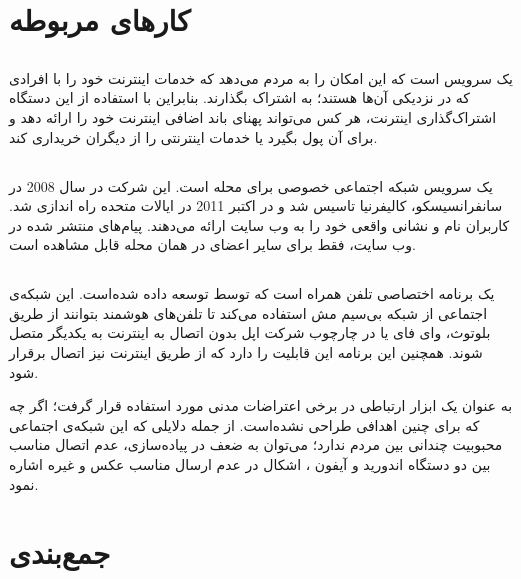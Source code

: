 \section{کار‌های مربوطه}
\subsection{}
 \href{https://www.opengarden.com}{}%
یک سرویس است که این امکان را به مردم می‌دهد که  خدمات اینترنت خود را با افرادی که در نزدیکی آن‌ها هستند؛ به اشتراک بگذارند. بنابراین با استفاده از این دستگاه اشتراک‌گذاری اینترنت، هر کس می‌تواند پهنای باند اضافی اینترنت خود را ارائه دهد و برای آن پول بگیرد یا خدمات اینترنتی را از دیگران خریداری کند.

\subsection{} 
 \href{https://nextdoor.com}{}%
یک سرویس شبکه اجتماعی خصوصی برای محله است. این شرکت در سال 2008 در سانفرانسیسکو، کالیفرنیا تاسیس شد و در اکتبر 2011 در ایالات متحده راه اندازی شد. کاربران 
نام و نشانی واقعی خود را به وب سایت ارائه می‌دهند. پیام‌های منتشر شده در وب سایت، فقط برای سایر اعضای  
در همان محله قابل مشاهده است.
\subsection{}
 \href{https://www.opengarden.com/firechat/}{}%
یک برنامه اختصاصی تلفن همراه است که توسط
توسعه داده شده‌است. این شبکه‌ی اجتماعی از شبکه بی‌سیم مش استفاده می‌کند تا تلفن‌های هوشمند بتوانند از طریق بلوتوث، وای فای یا در چارچوب
شرکت اپل بدون اتصال به اینترنت به یکدیگر متصل شوند. همچنین این برنامه این قابلیت را دارد که از طریق اینترنت نیز اتصال برقرار شود.

به عنوان یک ابزار ارتباطی در برخی اعتراضات مدنی مورد استفاده قرار گرفت؛ اگر چه که برای چنین اهدافی طراحی نشده‌است. از جمله دلایلی که این شبکه‌ی اجتماعی محبوبیت چندانی بین مردم ندارد؛ می‌توان به ضعف در پیاده‌سازی، عدم اتصال مناسب بین دو دستگاه اندورید
و آیفون
، اشکال در عدم ارسال مناسب عکس و غیره اشاره نمود.    
  
\section{جمع‌بندی}
